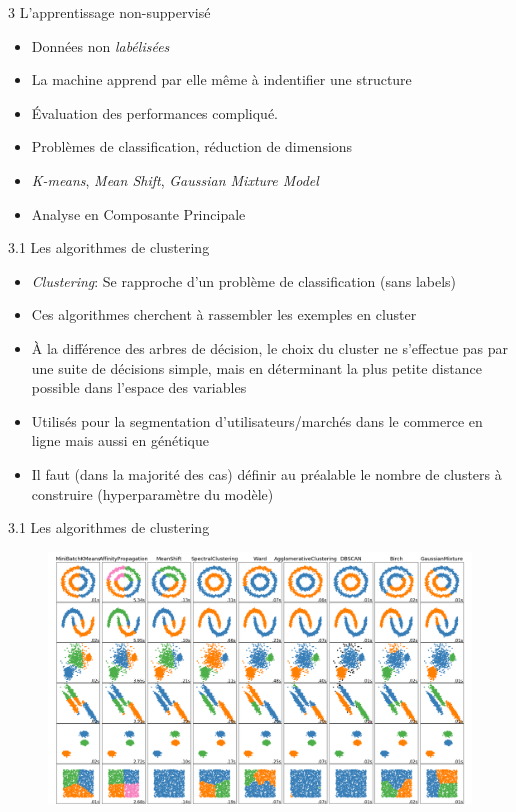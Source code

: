 \begin{frame}{3 L'apprentissage non-suppervisé}
  \begin{itemize}
  \item Données non \textit{labélisées}
  \item La machine apprend par elle même à indentifier une structure
  \item Évaluation des performances compliqué.
  \item Problèmes de classification, réduction de dimensions
  \item \textit{K-means}, \textit{Mean Shift}, \textit{Gaussian Mixture Model}
  \item Analyse en Composante Principale
  \end{itemize}  
\end{frame}

\begin{frame}{3.1 Les algorithmes de clustering}
  \begin{itemize}
  \item \textit{Clustering}: Se rapproche d'un problème de classification (sans labels)
  \item Ces algorithmes cherchent à rassembler les exemples en cluster
  \item À la différence des arbres de décision, le choix du cluster ne s'effectue pas par une suite de décisions simple, mais en déterminant la plus petite distance possible dans l'espace des variables
  \item Utilisés pour la segmentation d'utilisateurs/marchés dans le commerce en ligne mais aussi en génétique
  \item Il faut (dans la majorité des cas) définir au préalable le nombre de clusters à construire (hyperparamètre du modèle)
  \end{itemize}
\end{frame}

\begin{frame}{3.1 Les algorithmes de clustering}
  \begin{figure}
    \includegraphics[height=0.8\textheight]{figs/clusteringComparison.png}
  \end{figure}
\end{frame}

